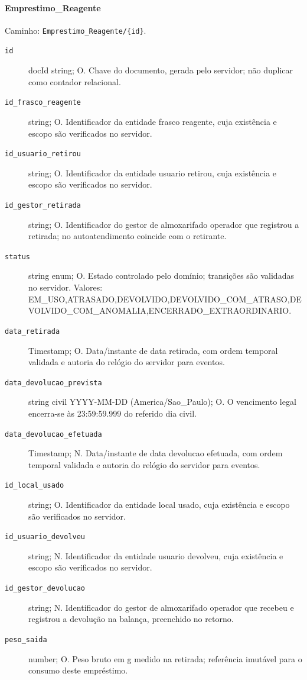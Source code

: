 \paragraph{Emprestimo\_Reagente}\mbox{}\par
Caminho: \texttt{Emprestimo\_Reagente/\{id\}}.
\begin{description}
\item[\texttt{id}] docId string; O. Chave do documento, gerada pelo servidor; não duplicar como contador relacional.
\item[\texttt{id\_frasco\_reagente}] string; O. Identificador da entidade frasco reagente, cuja existência e escopo são verificados no servidor.
\item[\texttt{id\_usuario\_retirou}] string; O. Identificador da entidade usuario retirou, cuja existência e escopo são verificados no servidor.
\item[\texttt{id\_gestor\_retirada}] string; O. Identificador do gestor de almoxarifado operador que registrou a retirada; no autoatendimento coincide com o retirante.
\item[\texttt{status}] string enum; O. Estado controlado pelo domínio; transições são validadas no servidor. Valores: EM\_USO,ATRASADO,DEVOLVIDO,DEVOLVIDO\_COM\_ATRASO,DEVOLVIDO\_COM\_ANOMALIA,ENCERRADO\_EXTRAORDINARIO.
\item[\texttt{data\_retirada}] Timestamp; O. Data/instante de data retirada, com ordem temporal validada e autoria do relógio do servidor para eventos.
\item[\texttt{data\_devolucao\_prevista}] string civil YYYY-MM-DD (America/Sao\_Paulo); O. O vencimento legal encerra-se às 23:59:59.999 do referido dia civil.
\item[\texttt{data\_devolucao\_efetuada}] Timestamp; N. Data/instante de data devolucao efetuada, com ordem temporal validada e autoria do relógio do servidor para eventos.
\item[\texttt{id\_local\_usado}] string; O. Identificador da entidade local usado, cuja existência e escopo são verificados no servidor.
\item[\texttt{id\_usuario\_devolveu}] string; N. Identificador da entidade usuario devolveu, cuja existência e escopo são verificados no servidor.
\item[\texttt{id\_gestor\_devolucao}] string; N. Identificador do gestor de almoxarifado operador que recebeu e registrou a devolução na balança, preenchido no retorno.
\item[\texttt{peso\_saida}] number; O. Peso bruto em g medido na retirada; referência imutável para o consumo deste empréstimo.

\end{description}
